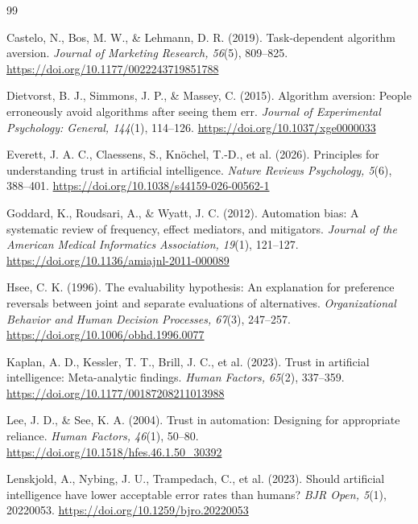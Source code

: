 \documentclass[11pt,a4paper]{article}
\begin{document}
\begingroup
\RaggedRight
\begin{thebibliography}{99}
\RaggedRight
{}

Castelo, N., Bos, M. W., \& Lehmann, D. R. (2019). Task-dependent algorithm aversion. \textit{Journal of Marketing Research, 56}(5), 809--825. \url{https://doi.org/10.1177/0022243719851788}

Dietvorst, B. J., Simmons, J. P., \& Massey, C. (2015). Algorithm aversion: People erroneously avoid algorithms after seeing them err. \textit{Journal of Experimental Psychology: General, 144}(1), 114--126. \url{https://doi.org/10.1037/xge0000033}

Everett, J. A. C., Claessens, S., Kn\"ochel, T.-D., et al. (2026). Principles for understanding trust in artificial intelligence. \textit{Nature Reviews Psychology, 5}(6), 388--401. \url{https://doi.org/10.1038/s44159-026-00562-1}

Goddard, K., Roudsari, A., \& Wyatt, J. C. (2012). Automation bias: A systematic review of frequency, effect mediators, and mitigators. \textit{Journal of the American Medical Informatics Association, 19}(1), 121--127. \url{https://doi.org/10.1136/amiajnl-2011-000089}

Hsee, C. K. (1996). The evaluability hypothesis: An explanation for preference reversals between joint and separate evaluations of alternatives. \textit{Organizational Behavior and Human Decision Processes, 67}(3), 247--257. \url{https://doi.org/10.1006/obhd.1996.0077}

Kaplan, A. D., Kessler, T. T., Brill, J. C., et al. (2023). Trust in artificial intelligence: Meta-analytic findings. \textit{Human Factors, 65}(2), 337--359. \url{https://doi.org/10.1177/00187208211013988}

Lee, J. D., \& See, K. A. (2004). Trust in automation: Designing for appropriate reliance. \textit{Human Factors, 46}(1), 50--80. \url{https://doi.org/10.1518/hfes.46.1.50_30392}

Lenskjold, A., Nybing, J. U., Trampedach, C., et al. (2023). Should artificial intelligence have lower acceptable error rates than humans? \textit{BJR Open, 5}(1), 20220053. \url{https://doi.org/10.1259/bjro.20220053}


\end{thebibliography}
\end{document}
